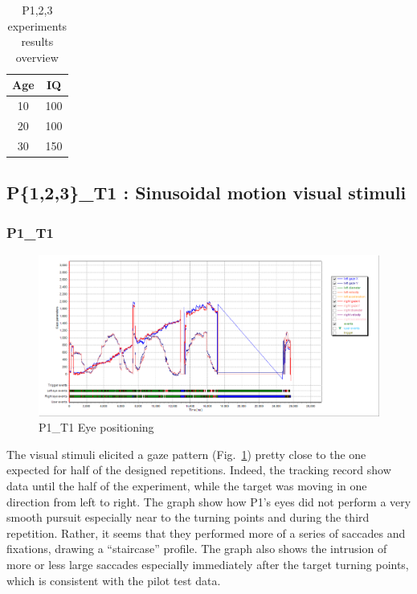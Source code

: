\begin{table}[h]
  \centering
  \begin{tabular}{c|c}
    Age  & IQ  \\ 
    \hline
    10   & 100 \\
    20   & 100 \\
    30   & 150
  \end{tabular}
  \caption{P{1,2,3} experiments results overview}
  \label{tab:expgroupresultssummary}
\end{table}



\subsection{P\{1,2,3\}\_T1 : Sinusoidal motion visual stimuli}
\label{sec:P123_T1}

\subsubsection{P1\_T1}
\label{sec:P1_T1}

\begin{figure}[h]
  \centering
  \includegraphics[width=.8\textwidth]{figures/graphs/P1_T1(sinusoid)_XY.png}
  \caption[P1\_T1 Eye positioning]{P1\_T1 Eye positioning}
  \label{fig:P1_T1_pos}
\end{figure}

The visual stimuli elicited a gaze pattern (Fig.~\ref{fig:P1_T1_pos}) pretty close to the one expected for half of the designed repetitions. Indeed, the tracking record show data until the half of the experiment, while the target was moving in one direction from left to right. The graph show how P1’s eyes did not perform a very smooth pursuit especially near to the turning points and during the third repetition. Rather, it seems that they performed more of a series of saccades and fixations, drawing a “staircase” profile.
The graph also shows the intrusion of more or less large saccades especially immediately after the target turning points, which is consistent with the pilot test data.

